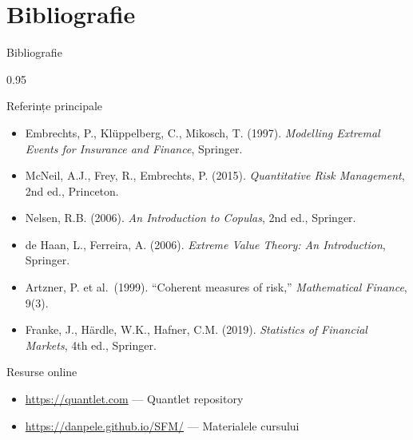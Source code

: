 \documentclass[9pt, aspectratio=169, t]{beamer}
\begin{document}
\section{Bibliografie}

\begin{frame}{Bibliografie}
    \begin{cminipage}{0.95\textwidth}
    \begin{block}{Referințe principale}
        {\small
        \begin{itemize}\setlength{\itemsep}{0pt}
            \item Embrechts, P., Kl\"{u}ppelberg, C., Mikosch, T. (1997). \textit{Modelling Extremal Events for Insurance and Finance}, Springer.
            \item McNeil, A.J., Frey, R., Embrechts, P. (2015). \textit{Quantitative Risk Management}, 2nd ed., Princeton.
            \item Nelsen, R.B. (2006). \textit{An Introduction to Copulas}, 2nd ed., Springer.
            \item de Haan, L., Ferreira, A. (2006). \textit{Extreme Value Theory: An Introduction}, Springer.
            \item Artzner, P. et al.\ (1999). ``Coherent measures of risk,'' \textit{Mathematical Finance}, 9(3).
            \item Franke, J., H\"{a}rdle, W.K., Hafner, C.M. (2019). \textit{Statistics of Financial Markets}, 4th ed., Springer.
        \end{itemize}
        }
    \end{block}

    \begin{exampleblock}{Resurse online}
        {\small
        \begin{itemize}\setlength{\itemsep}{0pt}
            \item \url{https://quantlet.com} --- Quantlet repository
            \item \url{https://danpele.github.io/SFM/} --- Materialele cursului
        \end{itemize}
        }
    \end{exampleblock}
    \end{cminipage}
\end{frame}
\end{document}
